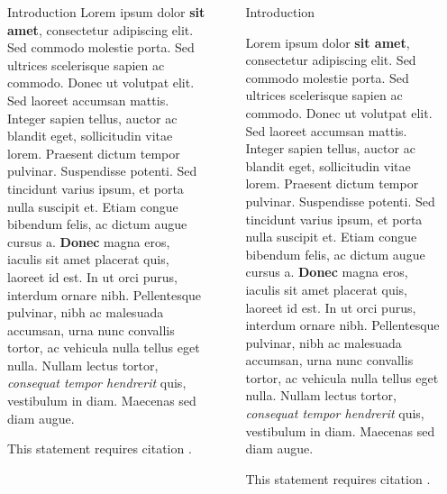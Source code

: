 \documentclass{beamer}
\newlength{\sepwid}
\newlength{\onecolwid}
\begin{document}
\begin{frame}[t]{}
\begin{columns}[t]
\begin{column}{\onecolwid}
\begin{block}{Introduction}
			Lorem ipsum dolor \textbf{sit amet}, consectetur adipiscing elit. Sed commodo molestie porta. Sed ultrices scelerisque sapien ac commodo. Donec ut volutpat elit. Sed laoreet accumsan mattis. Integer sapien tellus, auctor ac blandit eget, sollicitudin vitae lorem. Praesent dictum tempor pulvinar. Suspendisse potenti. Sed tincidunt varius ipsum, et porta nulla suscipit et. Etiam congue bibendum felis, ac dictum augue cursus a. \textbf{Donec} magna eros, iaculis sit amet placerat quis, laoreet id est. In ut orci purus, interdum ornare nibh. Pellentesque pulvinar, nibh ac malesuada accumsan, urna nunc convallis tortor, ac vehicula nulla tellus eget nulla. Nullam lectus tortor, \textit{consequat tempor hendrerit} quis, vestibulum in diam. Maecenas sed diam augue.

			This statement requires citation \cite{Smith:2012qr}.

				\end{block}
			\end{column}
			\begin{column}{\sepwid}\end{column}
			\begin{column}{\onecolwid}
				\begin{block}{Introduction}

			Lorem ipsum dolor \textbf{sit amet}, consectetur adipiscing elit. Sed commodo molestie porta. Sed ultrices scelerisque sapien ac commodo. Donec ut volutpat elit. Sed laoreet accumsan mattis. Integer sapien tellus, auctor ac blandit eget, sollicitudin vitae lorem. Praesent dictum tempor pulvinar. Suspendisse potenti. Sed tincidunt varius ipsum, et porta nulla suscipit et. Etiam congue bibendum felis, ac dictum augue cursus a. \textbf{Donec} magna eros, iaculis sit amet placerat quis, laoreet id est. In ut orci purus, interdum ornare nibh. Pellentesque pulvinar, nibh ac malesuada accumsan, urna nunc convallis tortor, ac vehicula nulla tellus eget nulla. Nullam lectus tortor, \textit{consequat tempor hendrerit} quis, vestibulum in diam. Maecenas sed diam augue.

			This statement requires citation \cite{Smith:2012qr}.

				\end{block}
			\end{column}
			\begin{column}{\sepwid}\end{column}

		\end{columns}
	\end{frame}
\end{document}

